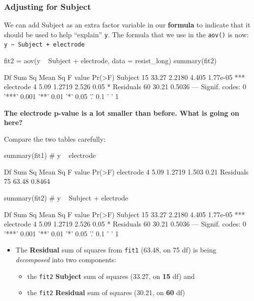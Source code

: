 \documentclass[a4paper]{article}
\begin{document}
\subsubsection{Adjusting for \textcolor{myred}{Subject}}
We can add Subject as an extra factor variable in our \textbf{formula} to indicate that it should be used to help ``explain'' \lstinline|y|. The formula that we use in the \lstinline|aov()| is now: \lstinline|y ~ Subject + electrode|
\begin{Schunk}
\begin{Sinput}
fit2 = aov(y ~ Subject + electrode, data = resist_long)
summary(fit2)
\end{Sinput}
\begin{Soutput}
            Df Sum Sq Mean Sq F value   Pr(>F)    
Subject     15  33.27  2.2180   4.405 1.77e-05 ***
electrode    4   5.09  1.2719   2.526     0.05 *  
Residuals   60  30.21  0.5036                     
---
Signif. codes:  0 '***' 0.001 '**' 0.01 '*' 0.05 '.' 0.1 ' ' 1
\end{Soutput}
\end{Schunk}
\begin{greenbox}
	\textbf{The electrode p-value is a lot smaller than before. What is going on here?}
\end{greenbox}
Compare the two tables carefully:
\begin{Schunk}
\begin{Sinput}
summary(fit1) # y ~ electrode
\end{Sinput}
\begin{Soutput}
            Df Sum Sq Mean Sq F value Pr(>F)
electrode    4   5.09  1.2719   1.503   0.21
Residuals   75  63.48  0.8464               
\end{Soutput}
\begin{Sinput}
summary(fit2) # y ~ Subject + electrode
\end{Sinput}
\begin{Soutput}
            Df Sum Sq Mean Sq F value   Pr(>F)    
Subject     15  33.27  2.2180   4.405 1.77e-05 ***
electrode    4   5.09  1.2719   2.526     0.05 *  
Residuals   60  30.21  0.5036                     
---
Signif. codes:  0 '***' 0.001 '**' 0.01 '*' 0.05 '.' 0.1 ' ' 1
\end{Soutput}
\end{Schunk}
\begin{itemize}
	\item The \textbf{Residual} sum of squares from \lstinline|fit1| (63.48, on 75 df) is being \textit{decomposed} into two components:
	\begin{itemize}
		\item the \lstinline|fit2| \textcolor{myred}{\textbf{Subject}} sum of squares (33.27, on \textbf{15} df) and
		\item the \lstinline|fit2| \textbf{Residual} sum of squares (30.21, on \textbf{60} df)
	\end{itemize}
\end{itemize}
\end{document}
